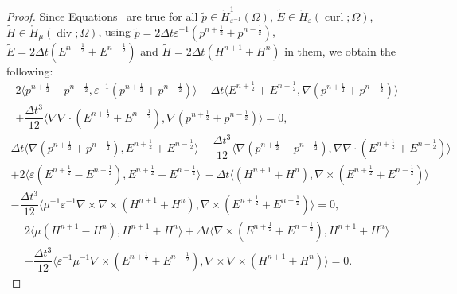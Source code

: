 \documentclass{amsart}
\theoremstyle{thmstyleone}%
\theoremstyle{thmstyletwo}%
\theoremstyle{thmstylethree}%
\DeclareMathOperator{\curl}{curl}
\def\divgn{\operatorname{div}}
\newcommand{\aInnerproduct}[2]{\bigl\langle #1, #2 \bigr\rangle}
\begin{document}
\begin{proof}
  Since Equations~ are true for all $\widetilde{p}\in \mathring{H}^1_{\varepsilon^{-1}}(\Omega)$, $\widetilde{E} \in \mathring{H}_{\varepsilon}(\curl; \Omega)$, $\widetilde{H} \in \mathring{H}_{\mu}(\divgn; \Omega)$, using $\widetilde{p} = 2 \Delta t \varepsilon^{-1} \left( p^{n + \frac{1}{2}} + p^{n - \frac{1}{2}} \right)$, $\widetilde{E} = 2 \Delta t \left(E^{n + \frac{1}{2}} + E^{n - \frac{1}{2}} \right)$ and $\widetilde{H} = 2 \Delta t \left(H^{n + 1} + H^n \right)$ in them, we obtain the following:
  \begin{multline*}
    2 \aInnerproduct{p^{n+\frac{1}{2}} - p^{n - \frac{1}{2}}}{\varepsilon^{-1} \left( p^{n + \frac{1}{2}} + p^{n-\frac{1}{2}} \right)} - \Delta t \aInnerproduct{E^{n + \frac{1}{2}} + E^{n - \frac{1}{2}}}{\nabla \left( p^{n + \frac{1}{2}} + p^{n - \frac{1}{2}} \right)} \\ + \dfrac{\Delta t^3}{12} \aInnerproduct{\nabla \nabla \cdot \left(E^{n + \frac{1}{2}} + E^{n - \frac{1}{2}}\right)}{\nabla \left( p^{n + \frac{1}{2}} + p^{n - \frac{1}{2}} \right)} =0,
\end{multline*}
\vspace{-1em} \begin{multline*}
  \Delta t \aInnerproduct{\nabla \left( p^{n + \frac{1}{2}} + p^{n - \frac{1}{2}} \right)}{E^{n + \frac{1}{2}} + E^{n - \frac{1}{2}}} - \dfrac{\Delta t^3}{12} \aInnerproduct{\nabla \left( p^{n + \frac{1}{2}} + p^{n - \frac{1}{2}} \right)}{\nabla \nabla \cdot \left(E^{n + \frac{1}{2}} + E^{n - \frac{1}{2}}\right)} \\ + 2 \aInnerproduct{\varepsilon \left(E^{n + \frac{1}{2}} - E^{n - \frac{1}{2}} \right)}{E^{n + \frac{1}{2}} + E^{n - \frac{1}{2}}} \, -
  \Delta t \aInnerproduct{\left( H^{n + 1} + H^n \right)}{\nabla \times \left( E^{n + \frac{1}{2}} + E^{n - \frac{1}{2}} \right)} \\ -  \dfrac{\Delta t^3}{12} \aInnerproduct{\mu^{-1}\varepsilon^{-1} \nabla \times \nabla \times \left( H^{n + 1} + H^n \right)}{\nabla \times \left( E^{n + \frac{1}{2}} + E^{n - \frac{1}{2}} \right)} = 0,
\end{multline*}
\vspace{-1em} \begin{multline*}
  2 \aInnerproduct{\mu \left(H^{n + 1} - H^{n} \right)}{H^{n + 1} + H^n} + \Delta t \aInnerproduct{\nabla \times \left( E^{n + \frac{1}{2}} + E^{n - \frac{1}{2}} \right)}{H^{n + 1} + H^n} \\ + \dfrac{\Delta t^3}{12}  \aInnerproduct{\varepsilon^{-1}\mu^{-1} \nabla \times \left( E^{n + \frac{1}{2}} + E^{n - \frac{1}{2}} \right)}{\nabla \times \nabla \times \left(H^{n + 1} + H^n \right)} = 0.

\end{multline*}
\end{proof}
\end{document}
